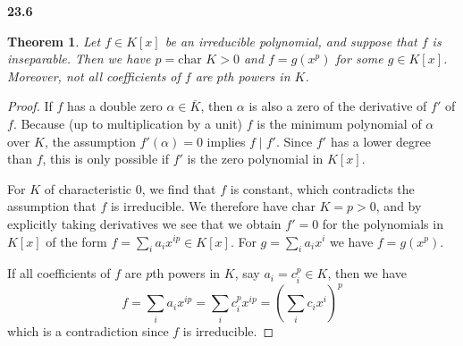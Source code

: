 \documentclass{article}
\theoremstyle{plain}
\newtheorem*{theorem*}{Theorem}
\theoremstyle{remark}
\newenvironment{colbox}[1]
    {\newcommand\colboxcolor{B6D0DE}%
    \begin{lrbox}{\selvestebox}%
    \begin{minipage}{\dimexpr\columnwidth-2\fboxsep\relax}\textbf{#1}}
    {\vspace{0.5em}\end{minipage}\end{lrbox}%
    \begin{center}
    \colorbox[HTML]{\colboxcolor}{\usebox{\selvestebox}}
    \end{center}}
\begin{document}
    \begin{colbox}{23.6}
        \begin{theorem*}
            Let $f\in K[x]$ be an irreducible polynomial, and suppose that $f$ is inseparable. Then we have $p=\text{char }K>0$ and $f=g(x^p)$ for some $g\in K[x]$.
            Moreover, not all coefficients of $f$ are $p$th powers in $K$.
        \end{theorem*}
    \end{colbox}
    \begin{proof}
        If $f$ has a double zero $\alpha\in\overline{K}$, then $\alpha$ is also a zero of the derivative of $f'$ of $f$. 
        Because (up to multiplication by a unit) $f$ is the minimum polynomial of $\alpha$ over $K$, the assumption $f'(\alpha)=0$ implies $f\mid f'$.
        Since $f'$ has a lower degree than $f$, this is only possible if $f'$ is the zero polynomial in $K[x]$. 
        
        For $K$ of characteristic 0, we find that $f$ is constant, which contradicts the assumption that $f$ is irreducible.
        We therefore have $\text{char }K=p>0$, and by explicitly taking derivatives we see that we obtain $f'=0$ for the polynomials in $K[x]$ of the form
        $f=\sum_i a_i x^{ip}\in K[x]$. For $g=\sum_i a_i x^i$ we have $f=g(x^p)$.

        If all coefficients of $f$ are $p$th powers in $K$, say $a_i=c_i^p\in K$, then we have 
        $$f=\sum_i a_ix^{ip}=\sum_i c_i^p x^{ip}=\left(\sum_i c_i x^i\right)^p$$
        which is a contradiction since $f$ is irreducible. 
    \end{proof}
\end{document}
